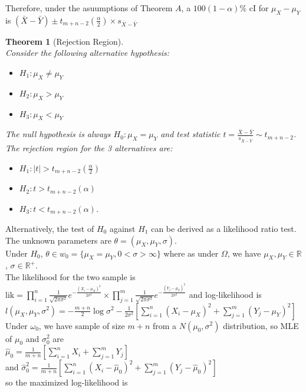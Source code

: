 \documentclass[12pt]{article}
\newtheorem{theorem}{Theorem}[section]
\theoremstyle{definition}
\begin{document}
Therefore, under the asuumptions of Theorem $A$, a $100(1-\alpha)\%$ cI for $\mu_X-\mu_Y$ is
$
(\bar{X}-\bar{Y})\pm t_{m+n-2}(\frac{\alpha}{2})\times s_{\bar{X}-\bar{Y}}
$
\begin{theorem}[Rejection Region]
\hfill\\\normalfont Consider the following alternative hypothesis:
\begin{itemize}
  \item $H_1:\mu_X\neq \mu_Y$
  \item $H_2:\mu_X>\mu_Y$
  \item $H_3:\mu_X<\mu_Y$
\end{itemize}
The null hypothesis is always $H_0:\mu_X=\mu_Y$ and test statistic $t=\frac{\bar{X}-\bar{Y}}{s_{\bar{X}-\bar{Y}}}\sim t_{m+n-2}$.\\
The rejection region for the 3 alternatives are:
\begin{itemize}
  \item $H_1:|t|>t_{m+n-2}(\frac{\alpha}{2})$
  \item $H_2:t>t_{m+n-2}(\alpha)$
  \item $H_3:t<t_{m+n-2}(\alpha)$.
\end{itemize}
\end{theorem}
Alternatively, the test of $H_0$ against $H_1$ can be derived as a likelihood ratio test. The unknown parameters are $\theta=(\mu_X,\mu_Y,\sigma)$.\\
Under $H_0$, $\theta\in w_0=\{\mu_X=\mu_Y,0<\sigma>\infty\}$ where as under $\Omega$, we have $\mu_X, \mu_Y\in \mathbb{R}$, $\sigma\in\mathbb{R}^{+}$. \\
The likelihood for the two sample is\\
$
\text{lik}=\prod_{i=1}^n\frac{1}{\sqrt{2\pi\sigma^2}}e^{-\frac{(X_i-\mu_X)^2}{2\sigma^2}}\times \prod_{j=1}^m\frac{1}{\sqrt{2\pi\sigma^2}}e^{-\frac{(Y_j-\mu_Y)^2}{2\sigma^2}}
$
and log-likelihood is\\
$
l(\mu_X,\mu_Y,\sigma^2)=-\frac{m+n}{2}\log \sigma^2-\frac{1}{2\sigma^2}[\sum_{i=1}^n (X_i-\mu_X)^2+\sum_{j=1}^m(Y_j-\mu_Y)^2]
$\\
Under $\omega_0$, we have sample of size $m+n$ from a $N(\mu_0,\sigma^2)$ distribution, so MLE of $\mu_0$ and $\sigma_0^2$ are \\
$
\hat{\mu}_0=\frac{1}{m+n}[\sum_{i=1}^n X_i+\sum_{j=1}^m Y_j]
$\\
and 
$
\hat{\sigma}_0^2 = \frac{1}{m+n}[\sum_{i=1}^n (X_i-\hat{\mu}_0)^2+\sum_{j=1}^m (Y_j-\hat{\mu}_0)^2]
$\\
so the maximized log-likelihood is
\end{document}
